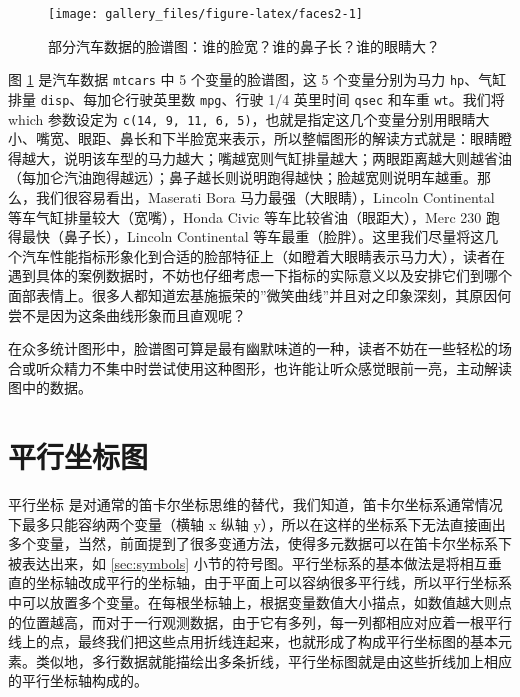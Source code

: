 \documentclass[
  b5paper,
  UTF8,twoside]{book}
\begin{document}
\begin{figure}

{\centering \texttt{[image: gallery\_files/figure-latex/faces2-1]} 

}

\caption[部分汽车数据的脸谱图]{部分汽车数据的脸谱图：谁的脸宽？谁的鼻子长？谁的眼睛大？}\label{fig:faces2}
\end{figure}

图 \ref{fig:faces2}
是汽车数据 \texttt{mtcars} 中 5 个变量的脸谱图，这 5 个变量分别为马力 \texttt{hp}、气缸排量 \texttt{disp}、每加仑行驶英里数 \texttt{mpg}、行驶 1/4 英里时间 \texttt{qsec} 和车重 \texttt{wt}。我们将 which 参数设定为 \texttt{c(14,\ 9,\ 11,\ 6,\ 5)}，也就是指定这几个变量分别用眼睛大小、嘴宽、眼距、鼻长和下半脸宽来表示，所以整幅图形的解读方式就是：眼睛瞪得越大，说明该车型的马力越大；嘴越宽则气缸排量越大；两眼距离越大则越省油（每加仑汽油跑得越远）；鼻子越长则说明跑得越快；脸越宽则说明车越重。那么，我们很容易看出，Maserati Bora 马力最强（大眼睛），Lincoln Continental 等车气缸排量较大（宽嘴），Honda Civic 等车比较省油（眼距大），Merc 230 跑得最快（鼻子长），Lincoln Continental 等车最重（脸胖）。这里我们尽量将这几个汽车性能指标形象化到合适的脸部特征上（如瞪着大眼睛表示马力大），读者在遇到具体的案例数据时，不妨也仔细考虑一下指标的实际意义以及安排它们到哪个面部表情上。很多人都知道宏基施振荣的''微笑曲线''并且对之印象深刻，其原因何尝不是因为这条曲线形象而且直观呢？

在众多统计图形中，脸谱图可算是最有幽默味道的一种，读者不妨在一些轻松的场合或听众精力不集中时尝试使用这种图形，也许能让听众感觉眼前一亮，主动解读图中的数据。

\hypertarget{sec:parcoords}{%
\section{平行坐标图}\label{sec:parcoords}}

平行坐标 \citep{Inselberg07} 是对通常的笛卡尔坐标思维的替代，我们知道，笛卡尔坐标系通常情况下最多只能容纳两个变量（横轴 x 纵轴 y），所以在这样的坐标系下无法直接画出多个变量，当然，前面提到了很多变通方法，使得多元数据可以在笛卡尔坐标系下被表达出来，如 \ref{sec:symbols} 小节的符号图。平行坐标系的基本做法是将相互垂直的坐标轴改成平行的坐标轴，由于平面上可以容纳很多平行线，所以平行坐标系中可以放置多个变量。在每根坐标轴上，根据变量数值大小描点，如数值越大则点的位置越高，而对于一行观测数据，由于它有多列，每一列都相应对应着一根平行线上的点，最终我们把这些点用折线连起来，也就形成了构成平行坐标图的基本元素。类似地，多行数据就能描绘出多条折线，平行坐标图就是由这些折线加上相应的平行坐标轴构成的。
\end{document}
